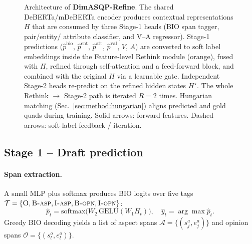 \documentclass[runningheads]{llncs}
\begin{document}
\begin{figure}[t]
{}
\caption{Architecture of \textbf{DimASQP-Refine}. The shared
DeBERTa/mDeBERTa encoder produces contextual representations $H$ that
are consumed by three Stage-1 heads (BIO span tagger, pair/entity/
attribute classifier, and V--A regressor). Stage-1 predictions
($\hat p^{\text{bio}}$, $\hat p^{\text{ent}}$, $\hat p^{\text{att}}$,
$\hat p^{\text{val}}$, $V$, $A$) are converted to soft label embeddings
inside the Feature-level Rethink module (orange), fused with $H$,
refined through self-attention and a feed-forward block, and combined
with the original $H$ via a learnable gate. Independent Stage-2 heads
re-predict on the refined hidden states $H^{\star}$. The whole Rethink
$\to$ Stage-2 path is iterated $R{=}2$ times. Hungarian matching
(Sec.~\ref{sec:method:hungarian}) aligns predicted and gold quads
during training. Solid arrows: forward features. Dashed arrows:
soft-label feedback / iteration.}
\label{fig:arch}
\end{figure}

\subsection{Stage 1 -- Draft prediction}
\label{sec:method:stage1}

\paragraph{Span extraction.}
A small MLP plus softmax produces BIO logits over five tags
$\mathcal{T}=\{\textsc{O}, \textsc{B-asp}, \textsc{I-asp},
\textsc{B-opn}, \textsc{I-opn}\}$:
\begin{equation}
\hat p_t = \mathrm{softmax}\big(W_2\,\mathrm{GELU}(W_1 H_t)\big),\quad
\hat y_t = \arg\max \hat p_t.
\end{equation}
Greedy BIO decoding yields a list of aspect spans
$\mathcal{A} = \{(s^a_j, e^a_j)\}$ and opinion spans
$\mathcal{O} = \{(s^o_l, e^o_l)\}$.
\end{document}
